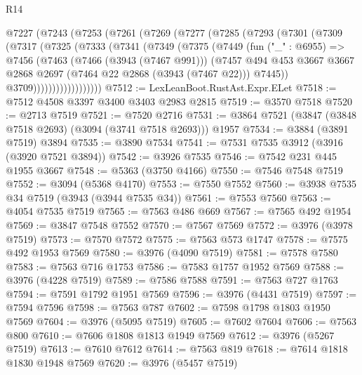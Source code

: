 \begin{lexlean}{R14}
\begin{coremodule}
    @7227
      (@7243
        (@7253
          (@7261
            (@7269
              (@7277
                (@7285
                  (@7293
                    (@7301
                      (@7309
                        (@7317
                          (@7325
                            (@7333
                              (@7341
                                (@7349
                                  (@7375
                                    (@7449
                                      (fun ("_" : @6955) =>
                                      @7456
                                        (@7463
                                          (@7466 (@3943 (@7467 @991)))
                                          (@7457
                                            @494
                                            @453
                                            @3667
                                            @3667
                                            @2868
                                            @2697
                                            (@7464 @22 @2868 (@3943 (@7467 @22)))
                                            @7445))
                                        @3709))))))))))))))))))
@7512 := LexLeanBoot.RustAst.Expr.ELet
@7518 := @7512 @4508 @3397 @3400 @3403 @2983 @2815
@7519 := @3570 @7518
@7520 := @2713 @7519
@7521 := @7520 @2716
@7531 := @3864 @7521 (@3847 (@3848 @7518 @2693) (@3094 (@3741 @7518 @2693))) @1957
@7534 := @3884 (@3891 @7519) @3894
@7535 := @3890 @7534
@7541 := @7531 @7535 @3912 (@3916 (@3920 @7521 @3894))
@7542 := @3926 @7535
@7546 := @7542 @231 @445 @1955 @3667
@7548 := @5363 (@3750 @4166)
@7550 := @7546 @7548 @7519
@7552 := @3094 (@5368 @4170)
@7553 := @7550 @7552
@7560 := @3938 @7535 @34 @7519 (@3943 (@3944 @7535 @34))
@7561 := @7553 @7560
@7563 := @4054 @7535 @7519
@7565 := @7563 @486 @669
@7567 := @7565 @492 @1954
@7569 := @3847 @7548 @7552
@7570 := @7567 @7569
@7572 := @3976 (@3978 @7519)
@7573 := @7570 @7572
@7575 := @7563 @573 @1747
@7578 := @7575 @492 @1953 @7569
@7580 := @3976 (@4090 @7519)
@7581 := @7578 @7580
@7583 := @7563 @716 @1753
@7586 := @7583 @1757 @1952 @7569
@7588 := @3976 (@4228 @7519)
@7589 := @7586 @7588
@7591 := @7563 @727 @1763
@7594 := @7591 @1792 @1951 @7569
@7596 := @3976 (@4431 @7519)
@7597 := @7594 @7596
@7598 := @7563 @787
@7602 := @7598 @1798 @1803 @1950 @7569
@7604 := @3976 (@5095 @7519)
@7605 := @7602 @7604
@7606 := @7563 @800
@7610 := @7606 @1808 @1813 @1949 @7569
@7612 := @3976 (@5267 @7519)
@7613 := @7610 @7612
@7614 := @7563 @819
@7618 := @7614 @1818 @1830 @1948 @7569
@7620 := @3976 (@5457 @7519)

\end{coremodule}
\end{lexlean}
